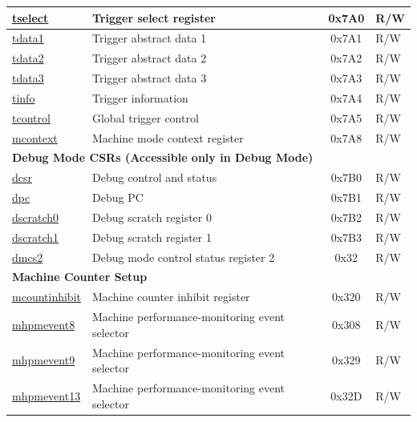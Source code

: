 \begin{longtable}{ | p{4.0cm} | p{8.4cm} | c | l | }
\hyperref[regdesc:TSELECT]{tselect} & Trigger select register & 0x7A0 & R/W \\\hline
\hyperref[regdesc:TDATA1]{tdata1} & Trigger abstract data 1 & 0x7A1 & R/W \\\hline
\hyperref[regdesc:TDATA2]{tdata2} & Trigger abstract data 2 & 0x7A2 & R/W \\\hline
\hyperref[regdesc:TDATA3]{tdata3} & Trigger abstract data 3 & 0x7A3 & R/W \\\hline
\hyperref[regdesc:TINFO]{tinfo} & Trigger information & 0x7A4 & R/W \\\hline
\hyperref[regdesc:TCONTROL]{tcontrol} & Global trigger control & 0x7A5 & R/W \\\hline
\hyperref[regdesc:MCONTEXT]{mcontext} & Machine mode context register & 0x7A8 & R/W \\\hline
\multicolumn{4}{|l|}{\textbf{Debug Mode CSRs (Accessible only in Debug Mode)}} \\\hline
\hyperref[regdesc:DCSR]{dcsr} & Debug control and status  & 0x7B0 & R/W \\\hline
\hyperref[regdesc:DPC]{dpc} & Debug PC & 0x7B1 & R/W \\\hline
\hyperref[regdesc:DSCRATCH0]{dscratch0} & Debug scratch register 0 & 0x7B2 & R/W \\\hline
\hyperref[regdesc:DSCRATCH1]{dscratch1} & Debug scratch register 1 & 0x7B3 & R/W \\\hline
\hyperref[regdesc:dmcs2]{dmcs2} & Debug mode control status register 2 & 0x32 & R/W \\\hline
\multicolumn{4}{|l|}{\textbf{Machine Counter Setup }} \\\hline
\hyperref[regdesc:MCOUNTINHIBIT]{mcountinhibit} & Machine counter inhibit register & 0x320 & R/W \\\hline
\hyperref[regdesc:MHPMEVENT8]{mhpmevent8} & Machine performance-monitoring event selector & 0x308 & R/W \\\hline
\hyperref[regdesc:MHPMEVENT9]{mhpmevent9} & Machine performance-monitoring event selector & 0x329& R/W \\\hline
\hyperref[regdesc:MHPMEVENT13]{mhpmevent13} & Machine performance-monitoring event selector & 0x32D & R/W \\\hline



\end{longtable}
